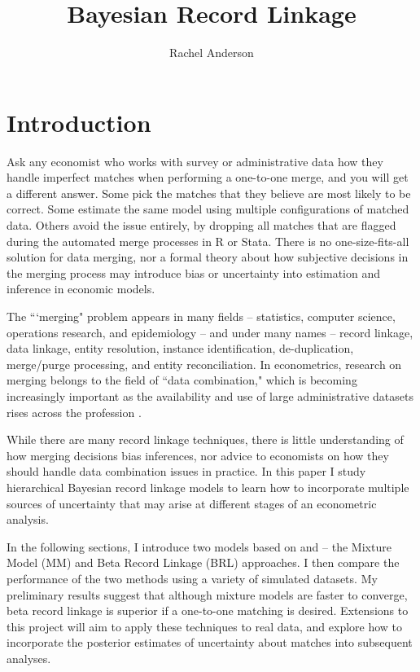 \documentclass[11pt,reqno]{amsart}
\title{Bayesian Record Linkage}
\author{Rachel Anderson}
\begin{document}
\vspace*{-1cm}
\maketitle


\section{Introduction}

Ask any economist who works with survey or administrative data how they handle imperfect matches when performing a one-to-one merge, and you will get a different answer.  Some pick the matches that they believe are most likely to be correct.  Some estimate the same model using multiple configurations of matched data.  Others avoid the issue entirely, by dropping all matches that are flagged during the automated merge processes in R or Stata.  There is no one-size-fits-all solution for data merging, nor a formal theory about how subjective decisions in the merging process may introduce bias or uncertainty into estimation and inference in economic models. 

The ```merging" problem appears in many fields -- statistics, computer science, operations research, and epidemiology -- and under many names -- record linkage, data linkage, entity resolution, instance identification, de-duplication, merge/purge processing, and entity reconciliation.  In econometrics, research on merging belongs to the field of ``data combination," which is becoming increasingly important as the availability and use of large administrative datasets rises across the profession \citep{ridder_moffitt_2007}.  

While there are many record linkage techniques, there is little understanding of how merging decisions bias inferences, nor advice to economists on how they should handle data combination issues in practice.  In this paper I study hierarchical Bayesian record linkage models to learn how to incorporate multiple sources of uncertainty that may arise at different stages of an econometric analysis.  

In the following sections, I introduce two models based on \cite{larsen_rubin_2001} and \cite{sadinle_2017} -- the Mixture Model (MM) and Beta Record Linkage (BRL) approaches.  I then compare the performance of the two methods using a variety of simulated datasets.  My preliminary results suggest that although mixture models are faster to converge, beta record linkage is superior if a one-to-one matching is desired.  Extensions to this project will aim to apply these techniques to real data, and explore how to incorporate the posterior estimates of uncertainty about matches into subsequent analyses. 
\end{document}
